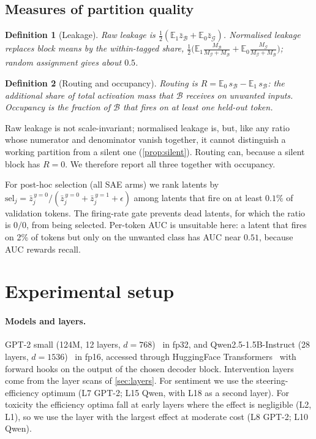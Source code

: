 \documentclass[11pt,a4paper]{article}
\newtheorem{definition}{Definition}
\theoremstyle{remark}
\newcommand{\E}{\mathbb{E}}
\newcommand{\Gset}{\mathcal{G}}
\newcommand{\Bset}{\mathcal{B}}
\begin{document}
\subsection{Measures of partition quality}
\label{sec:measures}
\begin{definition}[Leakage]
\emph{Raw leakage} is $\tfrac12(\E_1\bar z_{\Bset}+\E_0\bar z_{\Gset})$. \emph{Normalised leakage}
replaces block means by the within-tagged share,
$\tfrac12\big(\E_1\tfrac{M_{\Bset}}{M_{\Gset}+M_{\Bset}}+\E_0\tfrac{M_{\Gset}}{M_{\Gset}+M_{\Bset}}\big)$;
random assignment gives about $0.5$.
\end{definition}
\begin{definition}[Routing and occupancy]
\emph{Routing} is $R=\E_0\,s_{\Bset}-\E_1\,s_{\Bset}$: the additional share of total activation
mass that $\Bset$ receives on unwanted inputs. \emph{Occupancy} is the fraction of $\Bset$ that
fires on at least one held-out token.
\end{definition}
Raw leakage is not scale-invariant; normalised leakage is, but, like any ratio whose numerator
and denominator vanish together, it cannot distinguish a working partition from a silent one
(\cref{prop:silent}). Routing can, because a silent block has $R=0$. We therefore report all
three together with occupancy.

For post-hoc selection (all SAE arms) we rank latents by
$\mathrm{sel}_j=\bar z_j^{\,y=0}/(\bar z_j^{\,y=0}+\bar z_j^{\,y=1}+\epsilon)$ among latents that
fire on at least $0.1\%$ of validation tokens. The firing-rate gate prevents dead latents,
for which the ratio is $0/0$, from being selected. Per-token AUC is unsuitable here: a latent
that fires on 2\% of tokens but only on the unwanted class has AUC near $0.51$, because AUC
rewards recall.

\section{Experimental setup}
\label{sec:setup}

\paragraph{Models and layers.}
GPT-2 small (124M, 12 layers, $d=768$)~\citep{radford2019gpt2} in fp32, and
Qwen2.5-1.5B-Instruct (28 layers, $d=1536$)~\citep{qwen2024qwen25} in fp16, accessed through
HuggingFace Transformers~\citep{wolf2020transformers} with forward hooks on the output of the
chosen decoder block. Intervention layers come from the layer scans of \cref{sec:layers}. For
sentiment we use the steering-efficiency optimum (L7 GPT-2; L15 Qwen, with L18 as a second
layer). For toxicity the efficiency optima fall at early layers where the effect is negligible
(L2, L1), so we use the layer with the largest effect at moderate cost (L8 GPT-2; L10 Qwen).
\end{document}
